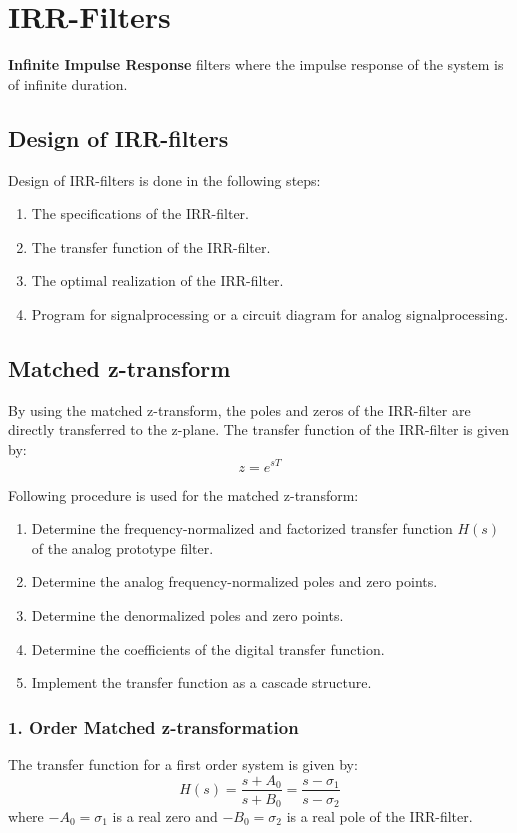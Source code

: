 \section{IRR-Filters}
\textbf{Infinite Impulse Response} filters where the impulse response of the system is of infinite duration.
\subsection{Design of IRR-filters}
Design of IRR-filters is done in the following steps:
\begin{enumerate}
  \item The specifications of the IRR-filter.
  \item The transfer function of the IRR-filter.
  \item The optimal realization of the IRR-filter.
  \item Program for signalprocessing or a circuit diagram for analog
    signalprocessing.
\end{enumerate}
\subsection{Matched z-transform}
By using the matched z-transform, the poles and zeros of the IRR-filter are directly transferred to the z-plane. The transfer function of the IRR-filter is given by:
$$z=e^{sT}$$

Following procedure is used for the matched z-transform:
\begin{enumerate}
  \item Determine the frequency-normalized and factorized transfer function $H(s)$ of the analog prototype filter.
  \item Determine the analog frequency-normalized poles and zero points.
  \item Determine the denormalized poles and zero points.
  \item Determine the coefficients of the digital transfer function.
  \item Implement the transfer function as a cascade structure.
\end{enumerate}
\subsubsection{1. Order Matched z-transformation}
The transfer function for a first order system is given by:
$$H(s)={\frac{s+A_{0}}{s+B_{0}}}={\frac{s-\sigma_{1}}{s-\sigma_{2}}}$$
where $-A_{0}=\sigma_1$ is a real zero and $-B_{0}=\sigma_2$ is a real pole of the IRR-filter.


